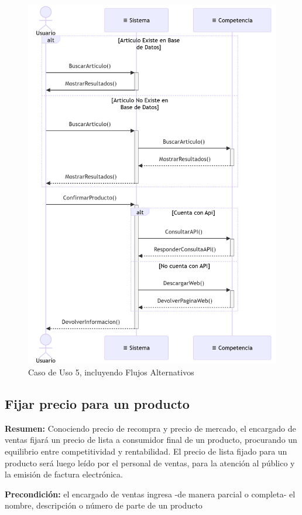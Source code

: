 \begin{figure}[H]
	\centering
	\vspace{15pt}
	\caption{Caso de Uso 5, incluyendo Flujos Alternativos}
	\vspace{15pt}
	\includegraphics[width=.8\textwidth]{img/04-diagrama-caso-5.png}
	\vspace{15pt}
\end{figure}

\pagebreak

\subsection{Fijar precio para un producto}

\textbf{Resumen:}
Conociendo precio de recompra y precio de mercado,
el encargado de ventas fijará un precio de lista a consumidor final de un producto,
procurando un equilibrio entre competitividad y rentabilidad.
El precio de lista fijado para un producto será luego leído por el personal de ventas,
para la atención al público y la emisión de factura electrónica.

\textbf{Precondición:} 
el encargado de ventas ingresa -de manera parcial o completa- el nombre, descripción o número de parte de un producto

